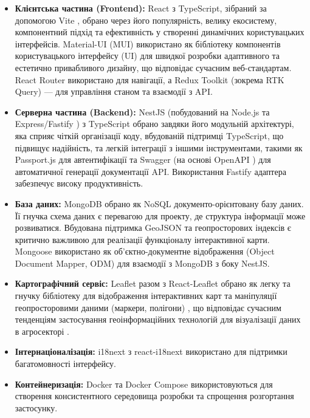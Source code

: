 \begin{itemize}
    \item \textbf{Клієнтська частина (Frontend):} React \cite{react} з TypeScript, зібраний за допомогою Vite \cite{vite}, обрано через його популярність, велику екосистему, компонентний підхід та ефективність у створенні динамічних користувацьких інтерфейсів. Material-UI (MUI) \cite{materialui} використано як бібліотеку компонентів користувацького інтерфейсу (UI) для швидкої розробки адаптивного та естетично привабливого дизайну, що відповідає сучасним веб-стандартам. React Router використано для навігації, а Redux Toolkit (зокрема RTK Query) \cite{reduxtoolkit} — для управління станом та взаємодії з API.
    \item \textbf{Серверна частина (Backend):} NestJS (побудований на Node.js та Express/Fastify \cite{fastify}) з TypeScript обрано завдяки його модульній архітектурі, яка сприяє чіткій організації коду, вбудованій підтримці TypeScript, що підвищує надійність, та легкій інтеграції з іншими інструментами, такими як Passport.js \cite{passportjs} для автентифікації та Swagger (на основі OpenAPI \cite{openapi}) для автоматичної генерації документації API. Використання Fastify адаптера забезпечує високу продуктивність.
    \item \textbf{База даних:} MongoDB \cite{mongodb} обрано як NoSQL документо-орієнтовану базу даних. Її гнучка схема даних є перевагою для проекту, де структура інформації може розвиватися. Вбудована підтримка GeoJSON та геопросторових індексів є критично важливою для реалізації функціоналу інтерактивної карти. Mongoose \cite{mongoose} використано як об'єктно-документне відображення (Object Document Mapper, ODM) для взаємодії з MongoDB з боку NestJS.
    \item \textbf{Картографічний сервіс:} Leaflet разом з React-Leaflet обрано як легку та гнучку бібліотеку для відображення інтерактивних карт та маніпуляції геопросторовими даними (маркери, полігони) \cite{leaflet}, що відповідає сучасним тенденціям застосування геоінформаційних технологій для візуалізації даних в агросекторі \cite{granell2015agrogeoinformatics}.
    \item \textbf{Інтернаціоналізація:} i18next \cite{i18next} з react-i18next використано для підтримки багатомовності інтерфейсу.
    \item \textbf{Контейнеризація:} Docker \cite{docker} та Docker Compose використовуються для створення консистентного середовища розробки та спрощення розгортання застосунку.

\end{itemize}
